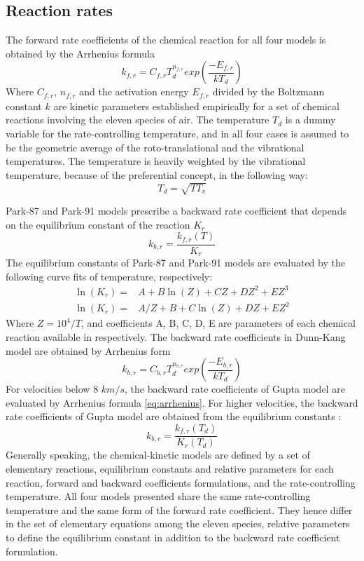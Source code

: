 \documentclass[11pt,a4paper,twocolumn]{article}
\begin{document}
\subsection{Reaction rates}
The forward rate coefficients of the chemical reaction for all four models is obtained by the Arrhenius formula \cite{blottner1969viscous}
\begin{equation}\label{eq:arrhenius}
    k_{f,r}=C_{f,r}T^{n_{f,r}}_d exp\left( \frac{-E_{f,r}}{k T_d}\right)
\end{equation}
Where $C_{f,r}$, $n_{f,r}$ and the activation energy $E_{f,r}$ divided by the Boltzmann constant $k$ are kinetic parameters established empirically for a set of chemical reactions involving the eleven species of air. The temperature $T_d$ is a dummy variable for the rate-controlling temperature, and in all four cases is assumed to be the geometric average of the roto-translational and the vibrational temperatures. The temperature is heavily weighted by the vibrational temperature, because of the preferential concept, in the following way:
\begin{equation}
    T_d = \sqrt{TT_{v}}
\end{equation}

Park-87 and Park-91 models prescribe a backward rate coefficient that depends on the equilibrium constant of the reaction $K_r$
\begin{equation}
    k_{b,r}=\frac{k_{f,r}(T)}{K_{r}}
\end{equation}
The equilibrium constants of Park-87 and Park-91 models are evaluated by the following curve fits of temperature, respectively:
\begin{align*}
    \ln(K_{r}) = &A + B \ln(Z) + C Z + D Z^2 + E Z^3\\
    \ln(K_{r}) = &A/Z + B + C \ln(Z) + D Z + E Z^2
\end{align*}
Where $Z=10^4/T$, and coefficients A, B, C, D, E are parameters of each chemical reaction available in  \cite{park1988assessment, park1991chemical} respectively. The backward rate coefficients in Dunn-Kang model are obtained by Arrhenius form \cite{dunn1973theoretical}
\begin{equation}
    k_{b,r}=C_{b,r}T^{n_{b,r}}_d exp\left( \frac{-E_{b,r}}{k T_d}\right)
\end{equation}
For velocities below $8$ $km/s$, the backward rate coefficients of Gupta model are evaluated by Arrhenius formula \ref{eq:arrhenius}. For higher velocities, the backward rate coefficients of Gupta model are obtained from the equilibrium constants \cite{gupta1990review}:
\begin{equation}
      k_{b,r}= \frac{k_{f,r}(T_d)}{K_{r}(T_d)} 
\end{equation}
Generally speaking, the chemical-kinetic models are defined by a set of elementary reactions, equilibrium constants and relative parameters for each reaction, forward and backward coefficients formulations, and the rate-controlling temperature. All four models presented share the same rate-controlling temperature and the same form of the forward rate coefficient. They hence differ in the set of elementary equations among the eleven species, relative parameters to define the equilibrium constant in addition to the backward rate coefficient formulation. 
\end{document}
